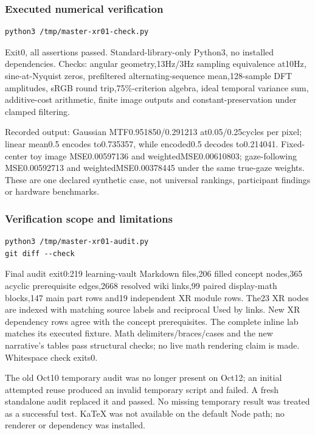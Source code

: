 \subsubsection{Executed numerical verification}\label{appendix-a103e7846d21-executed-numerical-verification}

\begin{verbatim}
python3 /tmp/master-xr01-check.py
\end{verbatim}

Exit0, all assertions passed. Standard-library-only Python3, no installed dependencies. Checks: angular geometry,13Hz/3Hz sampling equivalence at10Hz, sine-at-Nyquist zeros, prefiltered alternating-sequence mean,128-sample DFT amplitudes, sRGB round trip,75\%-criterion algebra, ideal temporal variance sum, additive-cost arithmetic, finite image outputs and constant-preservation under clamped filtering.

Recorded output: Gaussian MTF0.951850/0.291213 at0.05/0.25cycles per pixel; linear mean0.5 encodes to0.735357, while encoded0.5 decodes to0.214041. Fixed-center toy image MSE0.00597136 and weightedMSE0.00610803; gaze-following MSE0.00592713 and weightedMSE0.00378445 under the same true-gaze weights. These are one declared synthetic case, not universal rankings, participant findings or hardware benchmarks.

\subsubsection{Verification scope and limitations}\label{appendix-a103e7846d21-verification-scope-and-limitations}

\begin{verbatim}
python3 /tmp/master-xr01-audit.py
git diff --check
\end{verbatim}

Final audit exit0:219 learning-vault Markdown files,206 filled concept nodes,365 acyclic prerequisite edges,2668 resolved wiki links,99 paired display-math blocks,147 main part rows and19 independent XR module rows. The23 XR nodes are indexed with matching source labels and reciprocal Used by links. New XR dependency rows agree with the concept prerequisites. The complete inline lab matches its executed fixture. Math delimiters/braces/cases and the new narrative's tables pass structural checks; no live math rendering claim is made. Whitespace check exits0.

The old Oct10 temporary audit was no longer present on Oct12; an initial attempted reuse produced an invalid temporary script and failed. A fresh standalone audit replaced it and passed. No missing temporary result was treated as a successful test. KaTeX was not available on the default Node path; no renderer or dependency was installed.


